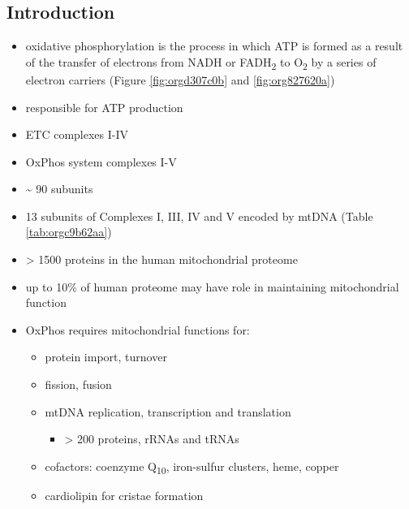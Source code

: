 \documentclass[12pt]{scrartcl}
\begin{document}
\subsection{Introduction}
\label{sec:org7c6df6c}
\begin{itemize}
\item oxidative phosphorylation is the process in which ATP is formed as a
result of the transfer of electrons from NADH or FADH\textsubscript{2} to O\textsubscript{2} by a
series of electron carriers (Figure \ref{fig:orgd307c0b} and \ref{fig:org827620a})
\item responsible for ATP production
\item ETC complexes I-IV
\item OxPhos system complexes I-V
\item \textasciitilde{} 90 subunits
\item 13 subunits of Complexes I, III, IV and V encoded by mtDNA (Table \ref{tab:orgc9b62aa})
\item \textgreater{} 1500 proteins in the human mitochondrial proteome
\item up to 10\% of human proteome may have role in maintaining mitochondrial function
\item OxPhos requires mitochondrial functions for:
\begin{itemize}
\item protein import, turnover
\item fission, fusion
\item mtDNA replication, transcription and translation
\begin{itemize}
\item \textgreater{} 200 proteins, rRNAs and tRNAs
\end{itemize}
\item cofactors: coenzyme Q\textsubscript{10}, iron-sulfur clusters, heme, copper
\item cardiolipin for cristae formation
\end{itemize}


\end{itemize}
\end{document}
